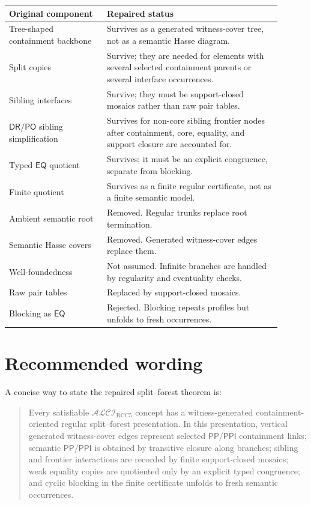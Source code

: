 \documentclass[11pt]{article}
\newcommand{\ALCI}{\mathcal{ALCI}}
\newcommand{\RCC}{\mathrm{RCC5}}
\newcommand{\PP}{\mathsf{PP}}
\newcommand{\PPI}{\mathsf{PPI}}
\newcommand{\PO}{\mathsf{PO}}
\newcommand{\DR}{\mathsf{DR}}
\newcommand{\EQ}{\mathsf{EQ}}
\theoremstyle{definition}
\theoremstyle{plain}
\begin{document}
\begin{center}
\renewcommand{\arraystretch}{1.25}
\begin{tabular}{p{0.32\linewidth}p{0.58\linewidth}}
\toprule
Original component & Repaired status \\
\midrule
Tree-shaped containment backbone & Survives as a generated witness-cover tree, not as a semantic Hasse diagram. \\
Split copies & Survive; they are needed for elements with several selected containment parents or several interface occurrences. \\
Sibling interfaces & Survive; they must be support-closed mosaics rather than raw pair tables. \\
$\DR/\PO$ sibling simplification & Survives for non-core sibling frontier nodes after containment, core, equality, and support closure are accounted for. \\
Typed $\EQ$ quotient & Survives; it must be an explicit congruence, separate from blocking. \\
Finite quotient & Survives as a finite regular certificate, not as a finite semantic model. \\
Ambient semantic root & Removed.  Regular trunks replace root termination. \\
Semantic Hasse covers & Removed.  Generated witness-cover edges replace them. \\
Well-foundedness & Not assumed.  Infinite branches are handled by regularity and eventuality checks. \\
Raw pair tables & Replaced by support-closed mosaics. \\
Blocking as $\EQ$ & Rejected.  Blocking repeats profiles but unfolds to fresh occurrences. \\
\bottomrule
\end{tabular}
\end{center}

\section{Recommended wording}

A concise way to state the repaired split--forest theorem is:

\begin{quote}
Every satisfiable $\ALCI_{\RCC}$ concept has a witness-generated containment-oriented regular split--forest presentation.  In this presentation, vertical generated witness-cover edges represent selected $\PP/\PPI$ containment links; semantic $\PP/\PPI$ is obtained by transitive closure along branches; sibling and frontier interactions are recorded by finite support-closed mosaics; weak equality copies are quotiented only by an explicit typed congruence; and cyclic blocking in the finite certificate unfolds to fresh semantic occurrences.
\end{quote}
\end{document}
